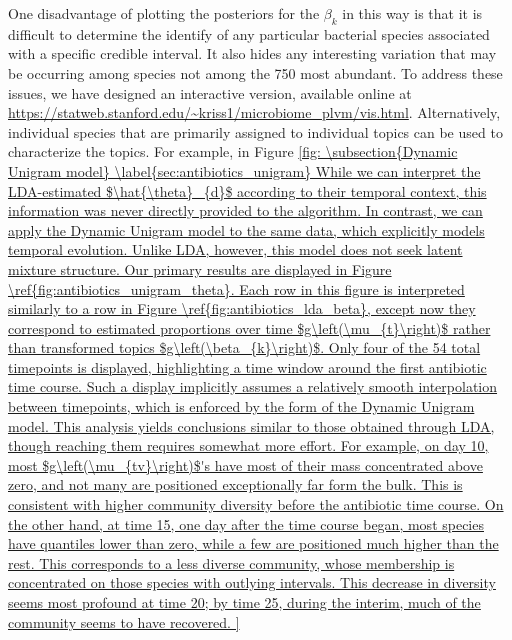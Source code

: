 \documentclass[oupdraft]{bio}
\begin{document}
One disadvantage of plotting the posteriors for the $\beta_{k}$ in this way is
that it is difficult to determine the identify of any particular bacterial
species associated with a specific credible interval. It also hides any
interesting variation that may be occurring among species not among the 750 most
abundant. To address these issues, we have designed an interactive version,
available online at
\url{https://statweb.stanford.edu/~kriss1/microbiome_plvm/vis.html}. Alternatively,
individual species that are primarily assigned to individual topics can be used
to characterize the topics. For example, in Figure \ref{fig:

\subsection{Dynamic Unigram model}
\label{sec:antibiotics_unigram}

While we can interpret the LDA-estimated $\hat{\theta}_{d}$ according to their
temporal context, this information was never directly provided to the algorithm.
In contrast, we can apply the Dynamic Unigram model to the same data, which
explicitly models temporal evolution. Unlike LDA, however, this model does not
seek latent mixture structure. Our primary results are displayed in Figure
\ref{fig:antibiotics_unigram_theta}.

Each row in this figure is interpreted similarly to a row in Figure
\ref{fig:antibiotics_lda_beta}, except now they correspond to estimated
proportions over time $g\left(\mu_{t}\right)$ rather than transformed topics
$g\left(\beta_{k}\right)$. Only four of the 54 total timepoints
is displayed, highlighting a time window around the first antibiotic time
course. Such a display implicitly assumes a relatively smooth interpolation
between timepoints, which is enforced by the form of the Dynamic Unigram model.

This analysis yields conclusions similar to those obtained through LDA, though
reaching them requires somewhat more effort. For example, on day 10, most
$g\left(\mu_{tv}\right)$'s have most of their mass concentrated above zero, and
not many are positioned exceptionally far form the bulk. This is consistent with
higher community diversity before the antibiotic time course. On the other hand,
at time 15, one day after the time course began, most species have quantiles
lower than zero, while a few are positioned much higher than the rest. This
corresponds to a less diverse community, whose membership is concentrated on
those species with outlying intervals. This decrease in diversity seems most
profound at time 20; by time 25, during the interim, much of the community seems
to have recovered.

}
\end{document}
